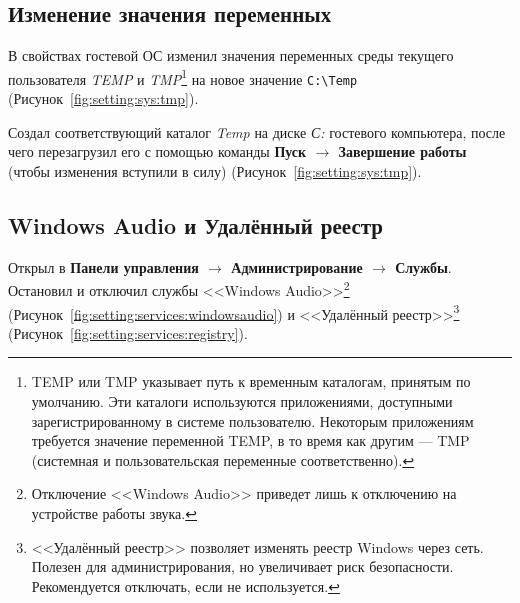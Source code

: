 \begin{image}
	\caption{Отключение автоматического обновления системы}
	\label{fig:setting:sys:update}
\end{image}

\clearpage

\subsection{Изменение значения переменных}

В свойствах гостевой ОС изменил значения переменных среды
текущего пользователя \textit{TEMP}
и \textit{TMP}\footnote{
TEMP или TMP указывает путь к временным каталогам, принятым по умолчанию.
Эти каталоги используются приложениями,
доступными зарегистрированному в системе пользователю.
Некоторым приложениям требуется значение переменной TEMP,
в то время как другим --- TMP
(системная и пользовательская переменные соответственно).
}
на новое значение \verb|C:\Temp| (Рисунок~\ref{fig:setting:sys:tmp}).

\begin{image}
	\caption{Изменение значения переменных среды}
	\label{fig:setting:sys:tmp}
\end{image}

Создал соответствующий каталог \textit{Temp}
на диске \textit{С:} гостевого компьютера, после
чего перезагрузил его с помощью команды
\textbf{Пуск $\rightarrow$ Завершение работы}
(чтобы изменения вступили в силу) (Рисунок~\ref{fig:setting:sys:tmp}).

\begin{image}
	\caption{Создание каталога \textit{Temp} на \textit{C:}}
	\label{fig:setting:sys:tmp}
\end{image}

\clearpage

\subsection{Windows Audio и Удалённый реестр}

Открыл в \textbf{Панели управления
$\rightarrow$ Администрирование $\rightarrow$ Службы}.
Остановил и отключил службы <<Windows Audio>>\footnote{
Отключение <<Windows Audio>> приведет лишь к отключению 
на устройстве работы звука.
} (Рисунок~\ref{fig:setting:services:windowsaudio})
и <<Удалённый реестр>>\footnote{
<<Удалённый реестр>> позволяет изменять реестр Windows через сеть.
Полезен для администрирования, но увеличивает риск безопасности.
Рекомендуется отключать, если не используется.
} (Рисунок~\ref{fig:setting:services:registry}).

